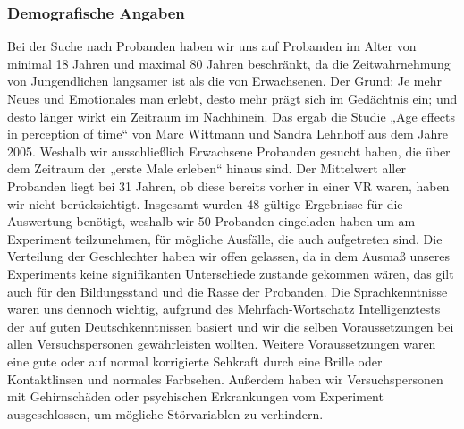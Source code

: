 \documentclass{Bericht}
\begin{document}
\subsubsection{Demografische Angaben}
Bei der Suche nach Probanden haben wir uns auf Probanden im Alter von minimal 18 Jahren
und maximal 80 Jahren beschränkt, da die Zeitwahrnehmung von Jungendlichen langsamer ist
als die von Erwachsenen. Der Grund: Je mehr Neues und Emotionales man erlebt, desto mehr
prägt sich im Gedächtnis ein; und desto länger wirkt ein Zeitraum im Nachhinein. Das ergab
die Studie „Age effects in perception of time“ von Marc Wittmann und Sandra Lehnhoff aus
dem Jahre 2005. Weshalb wir ausschließlich Erwachsene Probanden gesucht haben, die über
dem Zeitraum der „erste Male erleben“ hinaus sind. Der Mittelwert aller Probanden liegt bei 31
Jahren, ob diese bereits vorher in einer VR waren, haben wir nicht berücksichtigt.
Insgesamt wurden 48 gültige Ergebnisse für die Auswertung benötigt, weshalb wir 50 Probanden
eingeladen haben um am Experiment teilzunehmen, für mögliche Ausfälle, die auch aufgetreten
sind.
Die Verteilung der Geschlechter haben wir offen gelassen, da in dem Ausmaß unseres Experiments
keine signifikanten Unterschiede zustande gekommen wären, das gilt auch für den Bildungsstand
und die Rasse der Probanden. Die Sprachkenntnisse waren uns dennoch wichtig,
aufgrund des Mehrfach-Wortschatz Intelligenztests der auf guten Deutschkenntnissen basiert
und wir die selben Voraussetzungen bei allen Versuchspersonen gewährleisten wollten. Weitere
Voraussetzungen waren eine gute oder auf normal korrigierte Sehkraft durch eine Brille oder
Kontaktlinsen und normales Farbsehen. Außerdem haben wir Versuchspersonen mit Gehirnschäden
oder psychischen Erkrankungen vom Experiment ausgeschlossen, um mögliche Störvariablen
zu verhindern.
\end{document}

